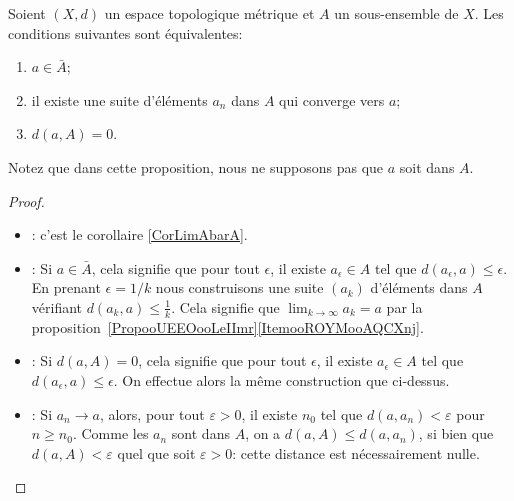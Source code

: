 \begin{proposition}     \label{PropGULUooNzqZKj}
    Soient \( (X,d) \) un espace topologique métrique et \( A\) un sous-ensemble de \(X \). Les conditions suivantes sont équivalentes:
\begin{enumerate}
		\item \label{PropGULUooNzqZKj_i}
			$a\in\bar A$;
		\item \label{PropGULUooNzqZKj_ii}
			il existe une suite d'éléments $a_n$ dans $A$ qui converge vers $a$;
		\item \label{PropGULUooNzqZKj_iii}
			$d(a,A)=0$.
	\end{enumerate}
\end{proposition}
Notez que dans cette proposition, nous ne supposons pas que $a$ soit dans $A$.

\begin{proof}
  \begin{itemize}
  \item [\ref{PropGULUooNzqZKj_ii} $\Rightarrow$ \ref{PropGULUooNzqZKj_i}]: c'est le corollaire \ref{CorLimAbarA}.
  \item [\ref{PropGULUooNzqZKj_i} $\Rightarrow$ \ref{PropGULUooNzqZKj_ii}]:
    Si \( a \in \bar A\), cela signifie que pour tout \( \epsilon\), il existe \( a_{\epsilon}\in A\) tel que \( d(a_{\epsilon},a)\leq \epsilon\). En prenant \(\epsilon=1/k\) nous construisons une suite \( (a_k)\) d'éléments dans \( A\) vérifiant \( d(a_k,a)\leq\frac{1}{ k }\). Cela signifie que \( \lim_{k\to \infty} a_k=a\) par la proposition~\ref{PropooUEEOooLeIImr}\ref{ItemooROYMooAQCXnj}.

  \item [\ref{PropGULUooNzqZKj_iii} $\Rightarrow$ \ref{PropGULUooNzqZKj_ii}]:
    Si \( d(a,A)=0\), cela signifie que pour tout \( \epsilon\), il existe \( a_{\epsilon}\in A\) tel que \( d(a_{\epsilon},a)\leq \epsilon\). On effectue alors la même construction que ci-dessus.

  \item [\ref{PropGULUooNzqZKj_ii} $\Rightarrow$ \ref{PropGULUooNzqZKj_iii}]:
    Si \( a_n \to a \), alors, pour tout \( \varepsilon > 0 \), il existe \( n_0 \) tel que \( d(a, a_n) < \varepsilon \) pour \(n \geq n_0 \). Comme les \( a_n \) sont dans \( A \), on a \( d (a, A) \leq d(a, a_n) \), si bien que \( d(a, A) < \varepsilon \) quel que soit  \( \varepsilon > 0 \): cette distance est nécessairement nulle.
  \end{itemize}
\end{proof}

